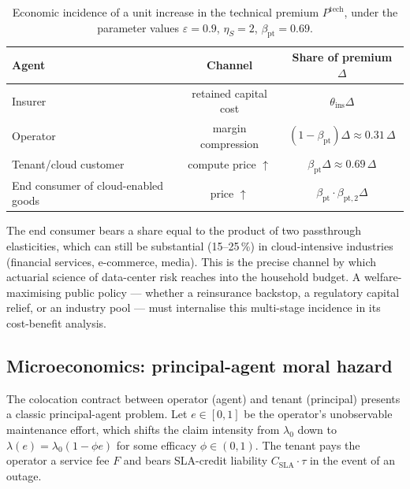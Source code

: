\begin{table}[ht]
\centering\footnotesize
\caption{Economic incidence of a unit increase in the technical
premium $P^{\mathrm{tech}}$, under the parameter values
$\varepsilon=0.9$, $\eta_S=2$, $\beta_{\mathrm{pt}}=0.69$.}\label{tab:incidence}
\begin{tabular}{lcc}
\toprule
Agent & Channel & Share of premium $\Delta$ \\
\midrule
Insurer & retained capital cost     & $\theta_{\mathrm{ins}}\Delta$ \\
Operator & margin compression         & $(1-\beta_{\mathrm{pt}})\Delta\approx 0.31\,\Delta$ \\
Tenant/cloud customer & compute price $\uparrow$ & $\beta_{\mathrm{pt}}\Delta\approx 0.69\,\Delta$ \\
End consumer of cloud-enabled goods & price $\uparrow$ & $\beta_{\mathrm{pt}}\cdot\beta_{\mathrm{pt,2}}\Delta$ \\
\bottomrule
\end{tabular}
\end{table}

\noindent The end consumer bears a share equal to the product of two
passthrough elasticities, which can still be substantial (15--25\,\%)
in cloud-intensive industries (financial services, e-commerce, media).
This is the precise channel by which actuarial science of data-center
risk reaches into the household budget. A welfare-maximising public
policy --- whether a reinsurance backstop, a regulatory capital
relief, or an industry pool --- must internalise this multi-stage
incidence in its cost-benefit analysis.

\subsection{Microeconomics: principal-agent moral hazard}\label{ss:moral}

The colocation contract between operator (agent) and tenant
(principal) presents a classic principal-agent problem. Let
$e\in[0,1]$ be the operator's unobservable maintenance effort, which
shifts the claim intensity from $\lambda_0$ down to
$\lambda(e)=\lambda_0(1-\phi e)$ for some efficacy $\phi\in(0,1)$. The
tenant pays the operator a service fee $F$ and bears SLA-credit
liability $C_{\mathrm{SLA}}\cdot\tau$ in the event of an outage.

